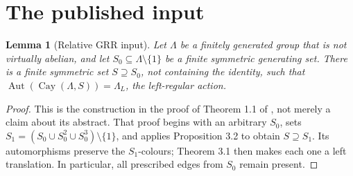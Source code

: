 \documentclass[11pt]{article}
\newtheorem{lemma}[theorem]{Lemma}
\DeclareMathOperator{\Aut}{Aut}
\DeclareMathOperator{\Cay}{Cay}
\begin{document}
\section{The published input}
\begin{lemma}[Relative GRR input]
Let $\Lambda$ be a finitely generated group that is not virtually abelian,
and let $S_0\subseteq\Lambda\setminus\{1\}$ be a finite symmetric generating
set. There is a finite symmetric set $S\supseteq S_0$, not containing the
identity, such that $\Aut(\Cay(\Lambda,S))=\Lambda_L$, the left-regular action.
\end{lemma}
\begin{proof}
This is the construction in the proof of Theorem 1.1 of \cite{LdS}, not
merely a claim about its abstract. That proof begins with an arbitrary
$S_0$, sets $S_1=(S_0\cup S_0^2\cup S_0^3)\setminus\{1\}$, and applies
Proposition 3.2 to obtain $S\supseteq S_1$. Its automorphisms preserve the
$S_1$-colours; Theorem 3.1 then makes each one a left translation.
In particular, all prescribed edges from $S_0$ remain present.
\end{proof}
\end{document}
